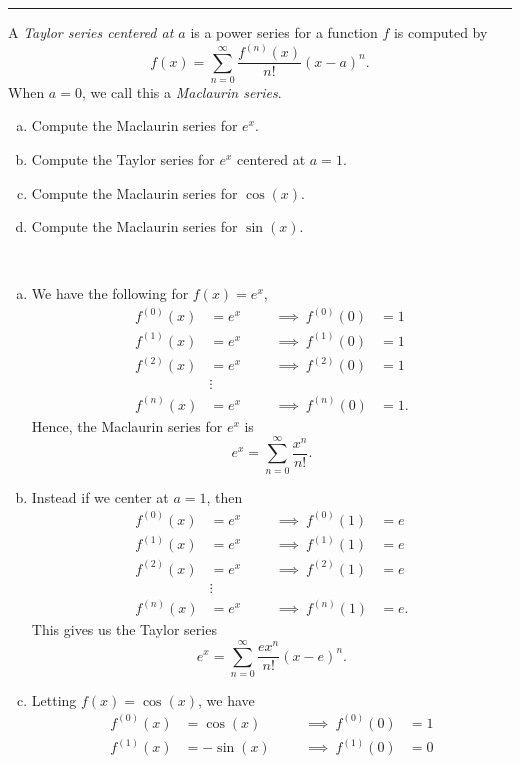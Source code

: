 \documentclass[12pt]{article} %
\begin{document}
\hrule
\begin{problem}
A \emph{Taylor series centered at $a$} is a power series for a function $f$ is computed by 
\[
f(x) = \sum_{n=0}^\infty \frac{f^{(n)}(x)}{n!}(x-a)^n.
\]
When $a=0$, we call this a \emph{Maclaurin series}.  
\begin{enumerate}[(a)]
    \item Compute the Maclaurin series for $e^x$.
    \item Compute the Taylor series for $e^x$ centered at $a=1$.
    \item Compute the Maclaurin series for $\cos(x)$.
    \item Compute the Maclaurin series for $\sin(x)$.
\end{enumerate}
\end{problem}
\begin{solution}~
\begin{enumerate}[(a)]
    \item We have the following for $f(x)=e^x$,
    \begin{align*}
        f^{(0)}(x)&=e^x &&& \implies~ f^{(0)}(0)&=1\\
        f^{(1)}(x)&=e^x &&& \implies~ f^{(1)}(0)&=1\\
        f^{(2)}(x)&=e^x &&& \implies~ f^{(2)}(0)&=1\\
        & \vdots \\
        f^{(n)}(x)&=e^x &&& \implies ~ f^{(n)}(0)&=1.
    \end{align*}
    Hence, the Maclaurin series for $e^x$ is 
    \[
    e^x =\sum_{n=0}^\infty \frac{x^n}{n!}.
    \]
    \item Instead if we center at $a=1$, then
        \begin{align*}
        f^{(0)}(x)&=e^x &&& \implies~ f^{(0)}(1)&=e\\
        f^{(1)}(x)&=e^x &&& \implies~ f^{(1)}(1)&=e\\
        f^{(2)}(x)&=e^x &&& \implies~ f^{(2)}(1)&=e\\
        & \vdots \\
        f^{(n)}(x)&=e^x &&& \implies ~ f^{(n)}(1)&=e.
    \end{align*}
    This gives us the Taylor series
    \[
    e^x = \sum_{n=0}^\infty \frac{ex^n}{n!} (x-e)^n.
    \]
    \item Letting $f(x)=\cos(x)$, we have
    \begin{align*}
        f^{(0)}(x)&=\cos(x) &&& \implies~ f^{(0)}(0)&=1\\
        f^{(1)}(x)&=-\sin(x) &&& \implies~ f^{(1)}(0)&=0\\

\end{align*}
\end{enumerate}
\end{solution}
\end{document}
